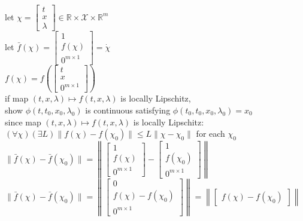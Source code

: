 \documentclass[12pt,letter]{article}
\newcommand{\R}{\mathbb{R}}
\begin{document}
\begin{itemize}
  let $\chi=\begin{bmatrix}t \\ x \\ \lambda \end{bmatrix} \in \R \times \mathcal{X} \times \R^m$\\
    
  let $\bar{f}(\chi)=\begin{bmatrix}1 \\ f(\chi) \\ 0^{m \times 1} \end{bmatrix} = \dot{\chi}$\\

  $f(\chi)=f\left(\begin{bmatrix}t \\ x \\ 0^{m \times 1} \end{bmatrix}\right)$\\

  if map $(t,x,\lambda)\mapsto f(t,x,\lambda)$ is locally Lipschitz,\\
  show $\phi(t,t_0,x_0,\lambda_0)$ is continuous satisfying $\phi(t_0,t_0,x_0,\lambda_0)=x_0$\\

  since map $(t,x,\lambda)\mapsto f(t,x,\lambda)$ is locally Lipschitz:\\
  $(\forall \chi)(\exists L)\|f(\chi)-f(\chi_0)\| \leq L \|\chi-\chi_0\|$ for each $\chi_0$\\
  
  $\|\bar{f}(\chi)-\bar{f}(\chi_0)\|=\left\|\begin{bmatrix}1 \\ f(\chi) \\ 0^{m \times 1}\end{bmatrix}-\begin{bmatrix}1 \\ f(\chi_0) \\ 0^{m \times 1} \end{bmatrix}\right\|$\\

  $\|\bar{f}(\chi)-\bar{f}(\chi_0)\|=\left\|\begin{bmatrix}0 \\ f(\chi)-f(\chi_0) \\ 0^{m \times 1} \end{bmatrix}\right\|=\left\|\begin{bmatrix}f(\chi)-f(\chi_0)\end{bmatrix}\right\|$\\
  

\end{itemize}
\end{document}
